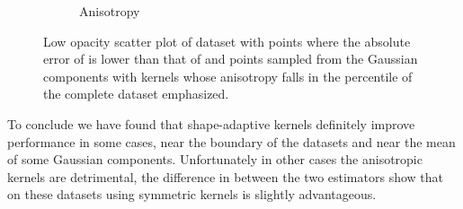 \begin{figure}
\begin{subfigure}{0.23\textwidth}
					\caption{Anisotropy}
					\label{fig:discussion:ferdosi3Noise:anisotropy}
				\end{subfigure}			
				\caption{Low opacity scatter plot of dataset \ferdosiThreeNoise with %
					 points where the absolute error of \mbe is lower than that of \sambe and %
					 points sampled from the Gaussian components with kernels whose anisotropy falls in the  percentile of the complete dataset emphasized.}
				\label{fig:discussion:ferdosi3Noise}
			\end{figure}		

To conclude we have found that shape-adaptive kernels definitely improve performance in some cases, \eg near the boundary of the datasets and near the mean of some Gaussian components. Unfortunately in other cases the anisotropic kernels are detrimental, the difference in \mse between the two estimators show that on these datasets using symmetric kernels is slightly advantageous. 